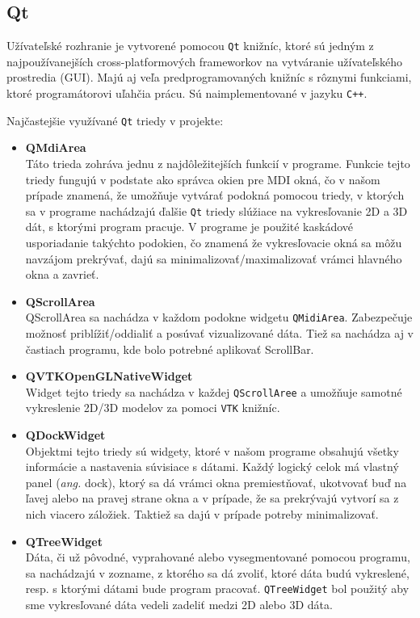 \documentclass[a4paper,11pt,oneside]{article}%
\begin{document}
\subsection{Qt}
Užívateľské rozhranie je vytvorené pomocou \texttt{Qt} knižníc, ktoré sú jedným z najpoužívanejších cross-platformových frameworkov na vytváranie užívateľského prostredia (GUI). Majú aj veľa predprogramovaných knižníc s rôznymi funkciami, ktoré programátorovi uľahčia prácu. Sú naimplementované v jazyku \texttt{C++}. 

Najčastejšie využívané \texttt{Qt} triedy v projekte:
\begin{itemize}
\item \textbf{QMdiArea}\\ 
Táto trieda zohráva jednu z najdôležitejších funkcií v programe. Funkcie tejto triedy fungujú v podstate ako správca okien pre MDI okná, čo v našom prípade znamená, že umožňuje vytvárať podokná pomocou triedy, v ktorých sa v programe nachádzajú ďalšie \texttt{Qt} triedy slúžiace na vykresľovanie 2D a 3D dát, s ktorými program pracuje. V programe je použité kaskádové usporiadanie takýchto podokien, čo znamená že vykresľovacie okná sa môžu navzájom prekrývať, dajú sa minimalizovať/maximalizovať vrámci hlavného okna a zavrieť.

\item \textbf{QScrollArea} \\
QScrollArea sa nachádza v každom podokne widgetu \texttt{QMidiArea}. Zabezpečuje možnosť priblížiť/oddialiť a posúvať vizualizované dáta. Tiež sa nachádza aj v častiach programu, kde bolo potrebné aplikovať ScrollBar.

\item \textbf{QVTKOpenGLNativeWidget} \\
Widget tejto triedy sa nachádza v každej \texttt{QScrollAree} a umožňuje samotné vykreslenie 2D/3D modelov za pomoci \texttt{VTK} knižníc. 

\item \textbf{QDockWidget} \\
Objektmi tejto triedy sú widgety, ktoré v našom programe obsahujú všetky informácie a nastavenia súvisiace s dátami. Každý logický celok má vlastný panel (\textit{ang.} dock), ktorý sa dá vrámci okna premiestňovať, ukotvovať buď na ľavej alebo na pravej strane okna a v prípade, že sa prekrývajú vytvorí sa z nich viacero záložiek. Taktiež sa dajú v prípade potreby minimalizovať.

\item \textbf{QTreeWidget} \\ 
Dáta, či už pôvodné, vyprahované alebo vysegmentované pomocou programu, sa nachádzajú v zozname, z ktorého sa dá zvoliť, ktoré dáta budú vykreslené, resp. s ktorými dátami bude program pracovať. \texttt{QTreeWidget} bol použitý aby sme vykresľované dáta vedeli zadeliť medzi 2D alebo 3D dáta.


\end{itemize}
\end{document}
